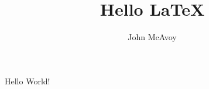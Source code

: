 \documentclass{article}
\title{Hello {\LaTeX}}
\author{John McAvoy}
\begin{document}
\maketitle
Hello World!
\end{document}
